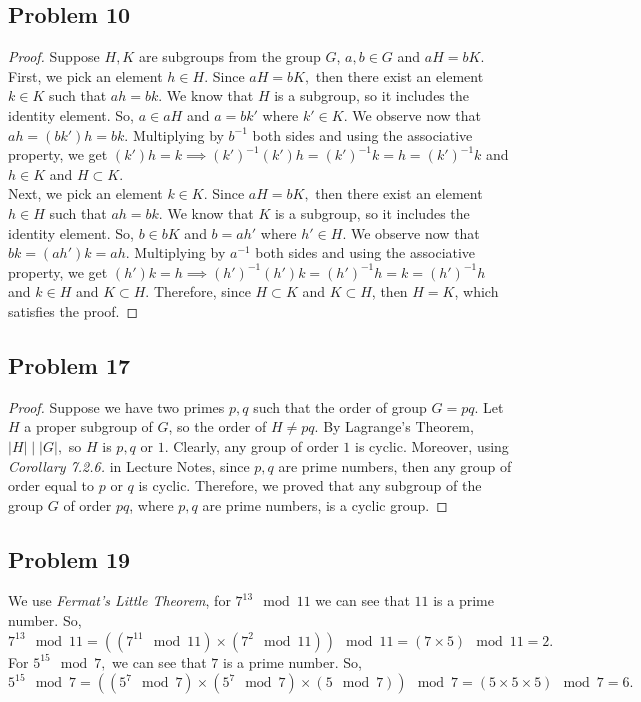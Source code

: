 \documentclass[a4paper,12pt]{article}
\begin{document}
\subsection*{Problem 10}
\begin{proof}
    Suppose $H,K$ are subgroups from the group $G$, $a,b \in G$ and $aH=bK.$ First, we pick an element $h \in H.$
    Since $aH=bK,$ then there exist an element $k\in K$ such that $ah=bk$. We know that $H$ is a subgroup, so it includes the identity element.
    So, $a \in aH$ and $a=bk'$ where $k' \in K.$ We observe now that $ah=(bk')h=bk$. Multiplying by $b^{-1}$ both sides and using the associative property, we get $(k')h=k \implies (k')^{-1}(k')h=(k')^{-1}k=h=(k')^{-1}k$ and $h \in K$ and $H \subset K$.
    \\Next,  we pick an element $k \in K.$ 
    Since $aH=bK,$ then there exist an element $h\in H$ such that $ah=bk$. We know that $K$ is a subgroup, so it includes the identity element.
    So, $b \in bK$ and $b=ah'$ where $h' \in H.$ We observe now that $bk=(ah')k=ah$. Multiplying by $a^{-1}$ both sides and using the associative property, we get $(h')k=h \implies (h')^{-1}(h')k=(h')^{-1}h=k=(h')^{-1}h$ and $k \in H$ and $K \subset H.$
    Therefore, since $H \subset K$ and $K \subset H$, then $H=K$, which satisfies the proof.
\end{proof}
\subsection*{Problem 17}
\begin{proof}
    Suppose we have two primes $p, q$ such that the order of group $G=pq.$ Let $H$ a proper subgroup of $G$, so the order of $H\ne pq.$ By Lagrange's Theorem, $|H| \mid |G|,$ so $H$ is $p,q$ or $1$. Clearly, any group of order $1$ is cyclic. Moreover, using \textit{Corollary 7.2.6.} in Lecture Notes, since $p,q$ are prime numbers, then any group of order equal to $p$ or $q$ is cyclic. Therefore, we proved that any subgroup of the group $G$ of order $pq$, where $p,q$ are prime numbers, is a cyclic group. 
\end{proof}
\subsection*{Problem 19}
We use \textit{Fermat's Little Theorem}, for $7^{13} \mod 11$ we can see that $11$ is a prime number. So, $7^{13} \mod 11=((7^{11} \mod 11) \times (7^2 \mod 11))\mod 11 = (7 \times 5) \mod 11=2.$
For $5^{15} \mod 7,$ we can see that $7$ is a prime number. So, $5^{15} \mod 7=((5^{7} \mod 7) \times (5^7 \mod 7) \times (5 \mod 7))\mod 7=(5 \times 5 \times 5) \mod 7=6.$
\end{document}
